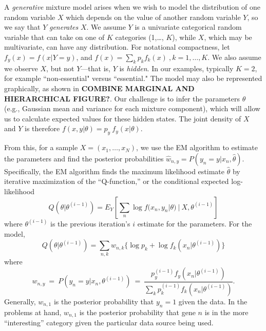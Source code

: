 \documentclass{bmcart}
\begin{document}
A \textit{generative} mixture model arises when we wish to model the distribution of one random variable $X$ which 
depends on the value of another random variable $Y$, so we say that $Y$ \textit{generates} $X$. We assume $Y$  is a 
univariate categorical random variable that can take on one of $K$ categories (1,\ldots, $K$), while $X$, which may be 
multivariate, can have any distribution. For notational compactness, let $f_y( x) = f( x | Y = y)$, and $f(x) = \sum_k p_k f_k( x) \ , k = 1, \ldots, K.$
We also assume we observe $X$, but not $Y$---that is, $Y$ is \textit{hidden}.
In our examples, typically $K=2$, for example ``non-essential" versus ``essential."  The 
model may also be represented graphically, as shown in \textbf{COMBINE MARGINAL AND HIERARCHICAL FIGURE?}. Our challenge is to infer the parameters $\theta$ (e.g., Gaussian mean and variance for each mixture component), which 
will allow us to calculate expected values for these hidden states.  The joint density of $X$ and $Y$ is therefore
$	f( x, y | \theta) = p_y \ f_y( x | \theta)$.

From this, for a sample $ X = ( x_1, \ldots,  x_N)$, we use the EM algorithm \citep{Dempster1977a, McLachlan2008a} to 
estimate the parameters and find the posterior probabilities $\hat w_{n,y} = P(y_n = y |  x_n, \hat\theta)$.  Specifically, 
the EM algorithm finds the maximum likelihood estimate $\hat\theta$ by iterative maximization of the ``Q-function,'' or the 
conditional expected log-likelihood
\begin{equation}
\label{eqn:qfun.defn}
	\textstyle Q(\theta|\theta^{(i-1)}) = E_{Y}\left[ \sum_n \log f( x_n, y_n | \theta) \ | \  X, \theta^{(i-1)}\right]
\end{equation}
where $\theta^{(i-1)}$ is the previous iteration's $i$ estimate for the parameters.  For the model,
\begin{equation}\label{eqn:qfun_mixmod}
	Q(\theta|\theta^{(i-1)})= \textstyle \sum_{n,k} w_{n,k} \{\log p_k + \log f_k( x_n | \theta^{(i-1)})\}
\end{equation}
where
\begin{equation}\label{eqn:w_n_y_mixmod}
	w_{n,y} \ = \ P(y_n = y |  x_n, \theta^{(i-1)}) \ = \ \frac{p_y^{(i-1)} f_y( x_n | \theta^{(i-1)})}{\sum_k p_k^{(i-1)} f_k( x_n | \theta^{(i-1)})}.
\end{equation}
Generally, $w_{n,1}$ is the posterior probability that $y_n = 1$ given the data.  In the problems at hand, $w_{n,1}$ is the posterior probability that gene $n$ is in the more ``interesting'' category given the particular data source being used.
\end{document}
